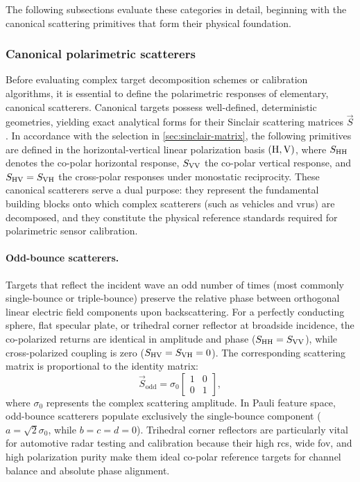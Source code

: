 The following subsections evaluate these categories in detail, beginning with the canonical scattering primitives that form their physical foundation.


\subsubsection{Canonical polarimetric scatterers}
\label{sec:canonical-scatterers}

Before evaluating complex target decomposition schemes or calibration algorithms, it is essential to define the polarimetric responses of elementary, canonical scatterers.
Canonical targets possess well-defined, deterministic geometries, yielding exact analytical forms for their Sinclair scattering matrices $\vec S$.
In accordance with the selection in \cref{sec:sinclair-matrix}, the following primitives are defined in the horizontal-vertical linear polarization basis $(\mathrm{H}, \mathrm{V})$, where $S_{\mathrm{HH}}$ denotes the co-polar horizontal response, $S_{\mathrm{VV}}$ the co-polar vertical response, and $S_{\mathrm{HV}} = S_{\mathrm{VH}}$ the cross-polar responses under monostatic reciprocity.
These canonical scatterers serve a dual purpose: they represent the fundamental building blocks onto which complex scatterers (such as vehicles and \glspl{vru}) are decomposed, and they constitute the physical reference standards required for polarimetric sensor calibration.

\paragraph{Odd-bounce scatterers.}
Targets that reflect the incident wave an odd number of times (most commonly single-bounce or triple-bounce) preserve the relative phase between orthogonal linear electric field components upon backscattering.
For a perfectly conducting sphere, flat specular plate, or trihedral corner reflector at broadside incidence, the co-polarized returns are identical in amplitude and phase ($S_{\mathrm{HH}} = S_{\mathrm{VV}}$), while cross-polarized coupling is zero ($S_{\mathrm{HV}} = S_{\mathrm{VH}} = 0$).
The corresponding scattering matrix is proportional to the identity matrix:
\begin{equation}
    \label{eq:canonical-odd-bounce}
    \vec S_{\text{odd}} = \sigma_{0} \begin{bmatrix} 1 & 0 \\ 0 & 1 \end{bmatrix},
\end{equation}
where $\sigma_{0}$ represents the complex scattering amplitude.
In Pauli feature space, odd-bounce scatterers populate exclusively the single-bounce component ($a = \sqrt{2}\sigma_{0}$, while $b = c = d = 0$).
Trihedral corner reflectors are particularly vital for automotive radar testing and calibration because their high \gls{rcs}, wide \gls{fov}, and high polarization purity make them ideal co-polar reference targets for channel balance and absolute phase alignment.

